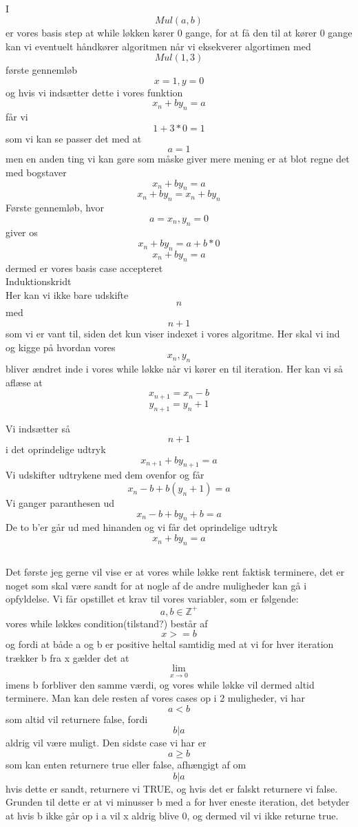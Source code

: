 \documentclass[12pt, a4paper, hidelinks]{article}
\begin{document}
\subsection{}
I $$ Mul(a, b) $$ er vores basis step at while løkken kører 0 gange, 
for at få den til at kører 0 gange kan vi eventuelt håndkører algoritmen når vi eksekverer 
algortimen med $$ Mul(1, 3) $$
første gennemløb $$ x = 1, y = 0 $$ og hvis vi indsætter dette i vores funktion
$$ x_{n} + by_{n} = a $$ får vi $$ 1 + 3 * 0 = 1 $$ som vi kan se passer det med at $$ a = 1 $$
men en anden ting vi kan gøre som måske giver mere mening er at blot regne det med bogstaver 
$$ x_{n} + by_{n} = a $$
$$ x_{n} +by_{n} = x_{n} + by_{n} $$
Første gennemløb, hvor $$ a = x_{n}, y_{n} =  0 $$ giver os
$$ x_{n} + by_{n} = a + b * 0  $$
$$ x_{n} + by_{n} = a $$
dermed er vores basis case accepteret \\

Induktionskridt \\
Her kan vi ikke bare udskifte $$ n $$ med $$ n+1 $$ som vi er vant til, siden det kun 
viser indexet i vores algoritme. Her skal vi ind og kigge på hvordan vores $$ x_{n}, y_{n}  $$ bliver ændret inde i vores 
while løkke når vi kører en til iteration. Her kan vi så aflæse at
$$ x_{n+1} = x_{n} - b $$
$$ y_{n+1} = y_{n} + 1 $$

Vi indsætter så $$ n+1 $$ i det oprindelige udtryk
$$ x_{n+1} + by_{n+1} = a $$
Vi udskifter udtrykene med dem ovenfor og får
$$ x_{n} - b + b(y_{n} + 1) = a $$
Vi ganger paranthesen ud
$$ x_{n} - b + by_{n} + b = a $$
De to b'er går ud med hinanden og vi får det oprindelige udtryk 
$$ x_{n} + by_{n} = a $$

\subsection{}
Det første jeg gerne vil vise er at vores while løkke rent faktisk terminere, det er noget som skal være sandt 
for at nogle af de andre muligheder kan gå i opfyldelse. 
Vi får opstillet et krav til vores variabler, som er følgende:
$$ a,b \in \mathbb{Z^+}  $$ vores while løkkes condition(tilstand?) består af $$ x >= b $$ og fordi at 
både a og b er positive heltal samtidig med at vi for hver iteration trækker b fra x gælder det at  $$ \lim_{x \to 0} $$ imens b forbliver 
den samme værdi, og vores while løkke vil dermed altid terminere.
Man kan dele resten af vores cases op i 2 muligheder, vi har $$ a < b $$ som altid vil returnere false, fordi $$ b|a $$ aldrig vil være muligt.
Den sidste case vi har er $$ a \geq b $$ som kan enten returnere true eller false, afhængigt af om $$ b|a $$ hvis dette er sandt, returnere vi TRUE, og hvis det er falskt 
returnere vi false. Grunden til dette er at vi minusser b med a for hver eneste iteration, det betyder at hvis b ikke går op i a vil x aldrig blive 0, og dermed vil vi ikke returne true. 
\end{document}
